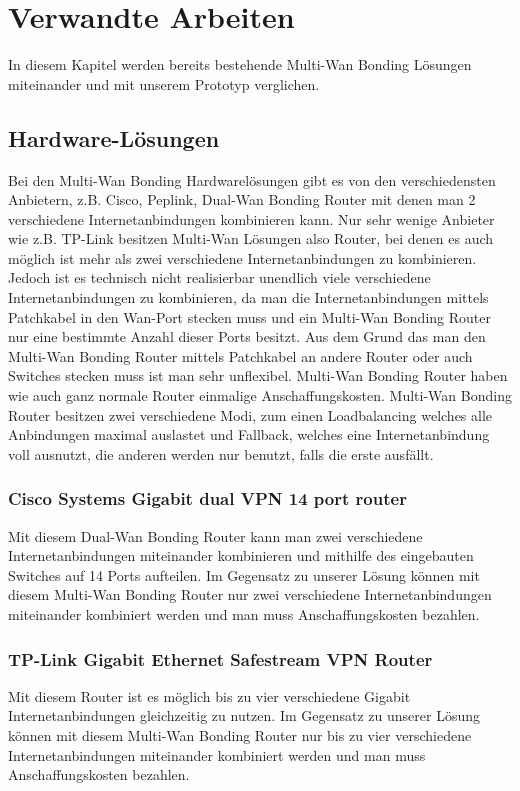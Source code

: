 \chapter{Verwandte Arbeiten}
\label{chap:VerwandteArbeiten}
In diesem Kapitel werden bereits bestehende Multi-Wan Bonding Lösungen miteinander und mit unserem Prototyp verglichen.


\section{Hardware-Lösungen}
Bei den Multi-Wan Bonding Hardwarelösungen gibt es von den verschiedensten Anbietern, z.B. Cisco, Peplink, Dual-Wan Bonding Router mit denen man 2 verschiedene Internetanbindungen kombinieren kann. Nur sehr wenige Anbieter wie z.B. TP-Link besitzen Multi-Wan Lösungen also Router, bei denen es auch möglich ist mehr als zwei verschiedene Internetanbindungen zu kombinieren. Jedoch ist es technisch nicht realisierbar unendlich viele verschiedene Internetanbindungen zu kombinieren, da man die Internetanbindungen mittels Patchkabel in den Wan-Port stecken muss und ein Multi-Wan Bonding Router nur eine bestimmte Anzahl dieser Ports besitzt. Aus dem Grund das man den Multi-Wan Bonding Router mittels Patchkabel an andere Router oder auch Switches stecken muss ist man sehr unflexibel. Multi-Wan Bonding Router haben wie auch ganz normale Router einmalige Anschaffungskosten.
\newline
\newline
Multi-Wan Bonding Router besitzen zwei verschiedene Modi, zum einen Loadbalancing welches alle Anbindungen maximal auslastet und Fallback, welches eine Internetanbindung voll ausnutzt, die anderen werden nur benutzt, falls die erste ausfällt.


\subsection{Cisco Systems Gigabit dual VPN 14 port router}
Mit diesem Dual-Wan Bonding Router kann man zwei verschiedene Internetanbindungen miteinander kombinieren und mithilfe des eingebauten Switches auf 14 Ports aufteilen. 
\newline
\newline
Im Gegensatz zu unserer Lösung können mit diesem Multi-Wan Bonding Router nur zwei verschiedene Internetanbindungen miteinander kombiniert werden und man muss Anschaffungskosten bezahlen. 


\subsection{TP-Link Gigabit Ethernet Safestream VPN Router}
Mit diesem Router ist es möglich bis zu vier verschiedene Gigabit Internetanbindungen gleichzeitig zu nutzen.
\newline
\newline
Im Gegensatz zu unserer Lösung können mit diesem Multi-Wan Bonding Router nur bis zu vier verschiedene Internetanbindungen miteinander kombiniert werden und man muss Anschaffungskosten bezahlen.



